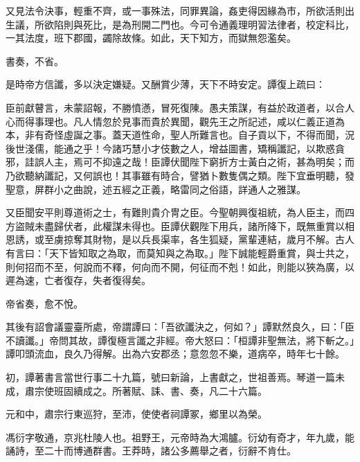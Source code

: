 \begin{pinyinscope}
又見法令決事，輕重不齊，或一事殊法，同罪異論，姦吏得因緣為市，所欲活則出生議，所欲陷則與死比，是為刑開二門也。今可令通義理明習法律者，校定科比，一其法度，班下郡國，蠲除故條。如此，天下知方，而獄無怨濫矣。

書奏，不省。

是時帝方信讖，多以決定嫌疑。又酬賞少薄，天下不時安定。譚復上疏曰：

臣前獻瞽言，未蒙詔報，不勝憤懣，冒死復陳。愚夫策謀，有益於政道者，以合人心而得事理也。凡人情忽於見事而貴於異聞，觀先王之所記述，咸以仁義正道為本，非有奇怪虛誕之事。蓋天道性命，聖人所難言也。自子貢以下，不得而聞，況後世淺儒，能通之乎！今諸巧慧小才伎數之人，增益圖書，矯稱讖記，以欺惑貪邪，詿誤人主，焉可不抑遠之哉！臣譚伏聞陛下窮折方士黃白之術，甚為明矣；而乃欲聽納讖記，又何誤也！其事雖有時合，譬猶卜數隻偶之類。陛下宜垂明聽，發聖意，屏群小之曲說，述五經之正義，略雷同之俗語，詳通人之雅謀。

又臣聞安平則尊道術之士，有難則貴介冑之臣。今聖朝興復祖統，為人臣主，而四方盜賊未盡歸伏者，此權謀未得也。臣譚伏觀陛下用兵，諸所降下，既無重賞以相恩誘，或至虜掠奪其財物，是以兵長渠率，各生狐疑，黨輩連結，歲月不解。古人有言曰：「天下皆知取之為取，而莫知與之為取。」陛下誠能輕爵重賞，與士共之，則何招而不至，何說而不釋，何向而不開，何征而不剋！如此，則能以狹為廣，以遲為速，亡者復存，失者復得矣。

帝省奏，愈不悅。

其後有詔會議靈臺所處，帝謂譚曰：「吾欲讖決之，何如？」譚默然良久，曰：「臣不讀讖。」帝問其故，譚復極言讖之非經。帝大怒曰：「桓譚非聖無法，將下斬之。」譚叩頭流血，良久乃得解。出為六安郡丞；意忽忽不樂，道病卒，時年七十餘。

初，譚著書言當世行事二十九篇，號曰新論，上書獻之，世祖善焉。琴道一篇未成，肅宗使班固續成之。所著賦、誄、書、奏，凡二十六篇。

元和中，肅宗行東巡狩，至沛，使使者祠譚冢，鄉里以為榮。

馮衍字敬通，京兆杜陵人也。祖野王，元帝時為大鴻臚。衍幼有奇才，年九歲，能誦詩，至二十而博通群書。王莽時，諸公多薦舉之者，衍辭不肯仕。


\end{pinyinscope}
